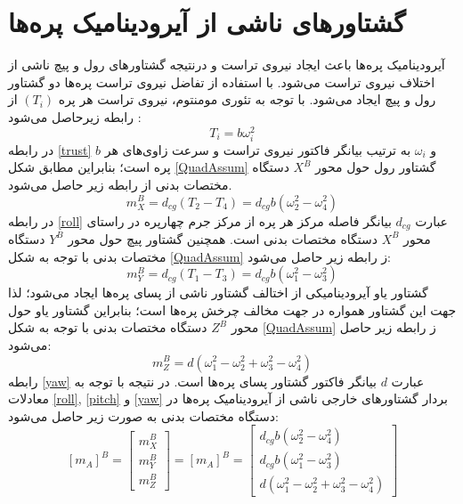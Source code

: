 \section{گشتاورهای ناشی از آيرودينامیک پره‌ها}
آیرودینامیک پره‌ها باعث ایجاد نیروی تراست و درنتیجه گشتاورهای رول و پیچ ناشی از اختلاف نیروی 
تراست می‌شود. با استفاده از تفاضل نیروی تراست پره‌ها دو گشتاور رول و پیچ ایجاد می‌شود. با توجه به تئوری مومنتوم، نیروی تراست هر پره 
$(T_i)$
از رابطه زیرحاصل می‌شود
\cite{Sharifi}
:
\begin{equation}\label{trust}
	T_i = b\omega_i^2
\end{equation}
در رابطه
\ref{trust}
$b$
و 
$\omega_i$
به ترتیب بیانگر فاکتور نیروی تراست و سرعت زاوی‌های هر پره است؛ بنابراین مطابق شکل 
\ref{QuadAssum}
گشتاور رول حول محور
$X^B$
دستگاه مختصات بدنی از رابطه زیر حاصل می‌شود.
\begin{equation}\label{roll}
	m_X^B = d_{cg}(T_2-T_4) = d_{cg}b(\omega_2^2-\omega_4^2)
\end{equation}
در رابطه 
\ref{roll}
عبارت 
$d_{cg}$
بیانگر فاصله مرکز هر پره از مرکز جرم چهارپره در راستای محور
$X^B$
دستگاه مختصات بدنی است. همچنین گشتاور پیچ حول محور 
$Y^B$
دستگاه مختصات بدنی با توجه به شكل
\ref{QuadAssum}
ز رابطه زیر حاصل می‌شود:
\begin{equation}\label{pitch}
	m_Y^B = d_{cg}(T_1-T_3) = d_{cg}b(\omega_1^2-\omega_3^2)
\end{equation}
گشتاور یاو آیرودینامیكی از اختالف گشتاور ناشی از پسای پره‌ها ایجاد می‌شود؛ لذا جهت این 
گشتاور همواره در جهت مخالف چرخش پره‌ها است؛ بنابراین گشتاور یاو حول محور
$Z^B$
دستگاه مختصات بدنی با توجه به شكل
\ref{QuadAssum}
ز رابطه زیر حاصل می‌شود:
\begin{equation}\label{yaw}
	m_Z^B = d(\omega_1^2-\omega_2^2+\omega_3^2-\omega_4^2)
\end{equation}
رابطه 
\ref{yaw}
عبارت 
$d$
بیانگر فاکتور گشتاور پسای پره‌ها است. در نتیجه با توجه به معادلات
\ref{roll},
\ref{pitch}
و
\ref{yaw}
بردار گشتاورهای خارجی ناشی از آیرودینامیک پره‌ها در دستگاه مختصات بدنی به صورت زیر حاصل می‌شود:
\begin{equation}
	\left[m_A\right]^B = \begin{bmatrix}
		m_X^B\\m_Y^B\\m_Z^B
	\end{bmatrix}
 = 	\left[m_A\right]^B = \begin{bmatrix}
 	d_{cg}b(\omega_2^2-\omega_4^2)\\
 	d_{cg}b(\omega_1^2-\omega_3^2)\\
 	d(\omega_1^2-\omega_2^2+\omega_3^2-\omega_4^2)
 \end{bmatrix}
\end{equation}